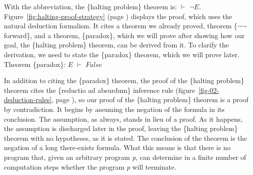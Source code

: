 With the abbreviation, the \{halting problem\} theorem is: $\vdash$ $\neg E$.
Figure~\ref{fig:halting-proof-strategy} (page \pageref{fig:halting-proof-strategy})
displays the proof, which uses the natural deduction formalism.
It cites a theorem we already proved, theorem \{$\neg \neg$ forward\}, and
a theorem, \{paradox\}, which we will prove
after showing how our goal, the \{halting problem\} theorem,
can be derived from it.
To clarify the derivation, we need to state the \{paradox\} theorem,
which we will prove later.
\vspace{2mm}\\
\hspace*{5mm}Theorem \{paradox\}: $E$ $\vdash$ $False$
\vspace{2mm}

In addition to citing the \{paradox\} theorem,
the proof of the \{halting problem\} theorem
cites the \{reductio ad absurdum\} inference rule
(figure~\ref{fig-02-deduction-rules}, page \pageref{fig-02-deduction-rules}),
so our proof of the \{halting problem\} theorem is a proof by contradiction.
It begins by assuming the negation of the formula in its conclusion.
The assumption, as always, stands in lieu of a proof.
As it happens, the assumption is discharged later in the proof,
leaving the \{halting problem\} theorem with no hypotheses,
as it is stated.
The conclusion of the theorem is the negation of a long there-exists formula.
What this means is that there is no program that,
given an arbitrary program \emph{p}, can
determine in a finite number of computation steps
whether the program \emph{p} will terminate.

